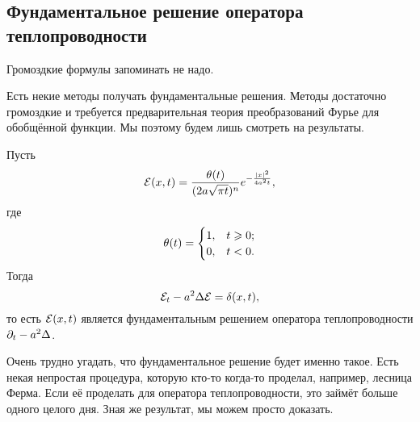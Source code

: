 \subsection{Фундаментальное решение оператора теплопроводности}
Громоздкие формулы запоминать не надо.

Есть некие методы получать фундаментальные решения. Методы достаточно громоздкие и требуется предварительная теория преобразований Фурье для обобщённой функции. Мы поэтому будем лишь смотреть на результаты.
\begin{The}
  Пусть
  \[
     \E(x,t) = \frac{\theta(t)}{(2a\sqrt{\pi t})^n}e^{-\frac{|x|^2}{4a^2t}},
  \]
  где
  \[
  \heviside[t]
  \]
Тогда
\[
  \E_t - a^2\Delta\E = \delta(x,t),
\]
то есть $\E(x,t)$ является фундаментальным решением оператора теплопроводности $\dl_t-a^2\Delta$.
\end{The}
Очень трудно угадать, что фундаментальное решение будет именно такое. Есть некая непростая процедура, которую кто-то когда-то проделал, например, лесница Ферма. Если её проделать для оператора теплопроводности, это займёт больше одного целого дня. Зная же результат, мы можем просто доказать.
